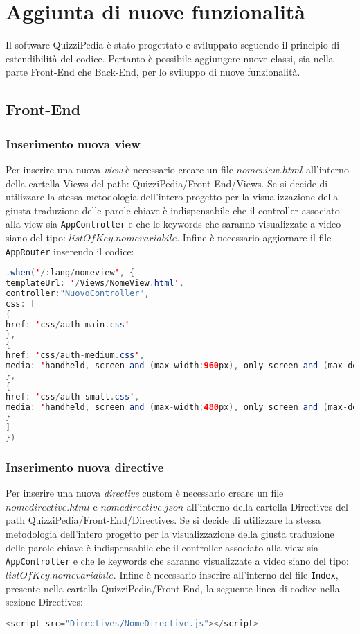 \newpage
\section{Aggiunta di nuove funzionalità}
Il software QuizziPedia è stato progettato e sviluppato seguendo il principio di estendibilità del codice. Pertanto è possibile aggiungere nuove classi, sia nella parte Front-End che Back-End, per lo sviluppo di nuove funzionalità.

\subsection{Front-End}

\subsubsection{Inserimento nuova view}
Per inserire una nuova \textit{view} è necessario creare un file $nomeview.html$ all'interno della cartella Views del path: QuizziPedia/Front-End/Views. Se si decide di utilizzare la stessa metodologia dell'intero progetto per la visualizzazione della giusta traduzione delle parole chiave è indispensabile che il controller associato alla view sia \texttt{AppController} e che le keywords che saranno visualizzate a video siano del tipo: \texttt{$listOfKey.nomevariabile$}. Infine è necessario aggiornare il file \texttt{AppRouter} inserendo il codice:

\begin{lstlisting}[language=Java,firstnumber=1]
.when('/:lang/nomeview', {
templateUrl: '/Views/NomeView.html',
controller:"NuovoController",
css: [
{
href: 'css/auth-main.css'
},
{
href: 'css/auth-medium.css',
media: 'handheld, screen and (max-width:960px), only screen and (max-device-width:960px)'
},
{
href: 'css/auth-small.css',
media: 'handheld, screen and (max-width:480px), only screen and (max-device-width:480px)'
}
]
})
\end{lstlisting}

\subsubsection{Inserimento nuova directive}
Per inserire una nuova \textit{directive} custom è necessario creare un file $nomedirective.html$ e $nomedirective.json$ all'interno della cartella Directives del path QuizziPedia/Front-End/Directives. Se si decide di utilizzare la stessa metodologia dell'intero progetto per la visualizzazione della giusta traduzione delle parole chiave è indispensabile che il controller associato alla view sia \texttt{AppController} e che le keywords che saranno visualizzate a video siano del tipo: \texttt{$listOfKey.nomevariabile$}. Infine è necessario inserire all'interno del file \texttt{Index}, presente nella cartella QuizziPedia/Front-End, la seguente linea di codice nella sezione Directives:
\begin{lstlisting}[language=Java,firstnumber=1]
<script src="Directives/NomeDirective.js"></script>
\end{lstlisting}



